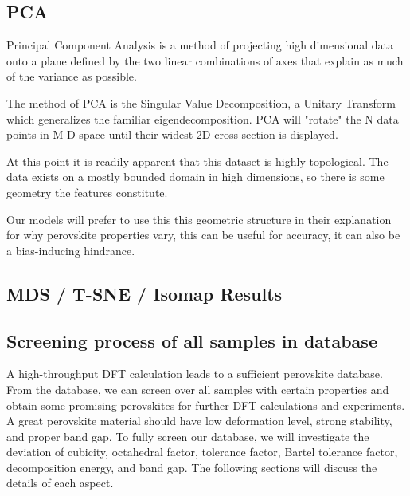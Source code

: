 \documentclass[twoside,twocolumn,9pt]{article}
\begin{document}
\subsection*{PCA}
Principal Component Analysis is a method of projecting high
dimensional data onto a plane defined by the two linear
combinations of axes that explain as much of the variance as
possible.

The method of PCA is the Singular Value Decomposition, a Unitary
Transform which generalizes the familiar eigendecomposition. PCA
will "rotate" the N data points in M-D space until their widest 2D
cross section is displayed.

At this point it is readily apparent that this dataset is highly
topological. The data exists on a mostly bounded domain in high
dimensions, so there is some geometry the features constitute.

Our models will prefer to use this this geometric structure in their
explanation for why perovskite properties vary, this can be useful
for accuracy, it can also be a bias-inducing hindrance.

\subsection*{MDS / T-SNE / Isomap Results}

\subsection*{Screening process of all samples in database}
A high-throughput DFT calculation leads to a sufficient perovskite
database. From the database, we can screen over all samples with
certain properties and obtain some promising perovskites for further
DFT calculations and experiments. A great perovskite material should
have low deformation level, strong stability, and proper band gap. To
fully screen our database, we will investigate the deviation of
cubicity, octahedral factor, tolerance factor, Bartel tolerance
factor, decomposition energy, and band gap. The following sections
will discuss the details of each aspect.
\end{document}
